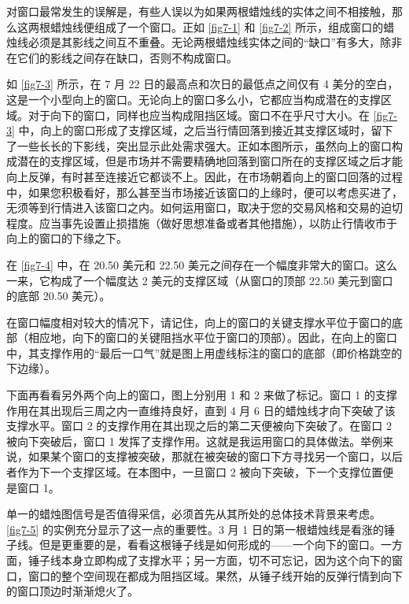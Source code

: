 对窗口最常发生的误解是，有些人误以为如果两根蜡烛线的实体之间不相接触，那么这两根蜡烛线便组成了一个窗口。正如 \autoref{fig7-1} 和 \autoref{fig7-2} 所示，组成窗口的蜡烛线必须是其影线之间互不重叠。无论两根蜡烛线实体之间的“缺口”有多大，除非在它们的影线之间存在缺口，否则不构成窗口。

如 \autoref{fig7-3} 所示，在 7 月 22 日的最高点和次日的最低点之间仅有 4 美分的空白，这是一个小型向上的窗口。无论向上的窗口多么小，它都应当构成潜在的支撑区域。对于向下的窗口，同样也应当构成阻挡区域。窗口不在乎尺寸大小。在 \autoref{fig7-3} 中，向上的窗口形成了支撑区域，之后当行情回落到接近其支撑区域时，留下了一些长长的下影线，突出显示此处需求强大。正如本图所示，虽然向上的窗口构成潜在的支撑区域，但是市场并不需要精确地回落到窗口所在的支撑区域之后才能向上反弹，有时甚至连接近它都谈不上。因此，在市场朝着向上的窗口回落的过程中，如果您积极看好，那么甚至当市场接近该窗口的上缘时，便可以考虑买进了，无须等到行情进入该窗口之内。如何运用窗口，取决于您的交易风格和交易的迫切程度。应当事先设置止损措施（做好思想准备或者其他措施），以防止行情收市于向上的窗口的下缘之下。

在 \autoref{fig7-4} 中，在 20.50 美元和 22.50 美元之间存在一个幅度非常大的窗口。这么一来，它构成了一个幅度达 2 美元的支撑区域（从窗口的顶部 22.50 美元到窗口的底部 20.50 美元）。

在窗口幅度相对较大的情况下，请记住，向上的窗口的关键支撑水平位于窗口的底部（相应地，向下的窗口的关键阻挡水平位于窗口的顶部）。因此，在向上的窗口中，其支撑作用的“最后一口气”就是图上用虚线标注的窗口的底部（即价格跳空的下边缘）。

下面再看看另外两个向上的窗口，图上分别用 1 和 2 来做了标记。窗口 1 的支撑作用在其出现后三周之内一直维持良好，直到 4 月 6 日的蜡烛线才向下突破了该支撑水平。窗口 2 的支撑作用在其出现之后的第二天便被向下突破了。在窗口 2 被向下突破后，窗口 1 发挥了支撑作用。这就是我运用窗口的具体做法。举例来说，如果某个窗口的支撑被突破，那就在被突破的窗口下方寻找另一个窗口，以后者作为下一个支撑区域。在本图中，一旦窗口 2 被向下突破，下一个支撑位置便是窗口 1。


单一的蜡烛图信号是否值得采信，必须首先从其所处的总体技术背景来考虑。\autoref{fig7-5} 的实例充分显示了这一点的重要性。3 月 1 日的第一根蜡烛线是看涨的锤子线。但是更重要的是，看看这根锤子线是如何形成的——一个向下的窗口。一方面，锤子线本身立即构成了支撑水平；另一方面，切不可忘记，因为这个向下的窗口，窗口的整个空间现在都成为阻挡区域。果然，从锤子线开始的反弹行情到向下的窗口顶边时渐渐熄火了。

